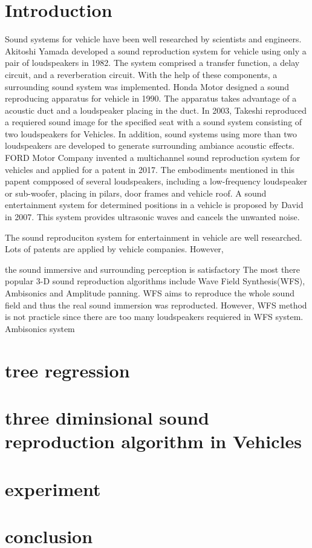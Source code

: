 \documentclass[runningheads,a4paper]{llncs}
\begin{document}
\section{Introduction}\label{sec:Intro}
Sound systems for vehicle have been well researched by scientists and engineers.   Akitoshi Yamada developed a sound reproduction system for vehicle using only a pair of loudspeakers in 1982\cite{Akito82}. The system comprised a transfer function, a delay circuit, and a reverberation circuit. With the help of these components, a surrounding sound system was implemented. 
Honda Motor designed a sound reproducing apparatus for vehicle in 1990\cite{terai1990sound}. The apparatus takes advantage of a acoustic duct and a loudspeaker placing in the duct. 
In 2003, Takeshi reproduced a requiered sound image for the specified seat with a sound system consisting of two loudspeakers for Vehicles\cite{Takeshi03}. 
In addition, sound systems using more than two loudspeakers are developed to generate surrounding ambiance acoustic effects\cite{clark1998vehicle}\cite{orellana2015loudspeaker}. 
FORD Motor Company invented a multichannel sound reproduction system for vehicles and applied for a patent in 2017\cite{orellana2015loudspeaker}. The embodiments mentioned in this papent compposed of several loudspeakers, including a low-frequency loudspeaker or sub-woofer, placing in pilars, door frames and vehicle roof. 
A sound entertainment system for determined positions in a vehicle is proposed by David in 2007. This system provides ultrasonic waves and cancels the unwanted noise\cite{David07}. 



The sound reproduciton system for entertainment in vehicle are well researched. Lots of patents are applied by vehicle companies\cite{Simon2005}\cite{Miriam2014}\cite{David07}\cite{Gibson15}. However, 

the sound immersive and surrounding perception is satisfactory
The most there popular 3-D sound reproduction algorithms include Wave Field Synthesis(WFS), Ambisonics and Amplitude panning. WFS aims to reproduce the whole sound field and thus the real sound immersion was reproducted. However, WFS method is not practicle since there are too many loudspeakers requiered in WFS system. Ambisonics system  


\section{tree regression}\label{sec:regression}

\section{three diminsional sound reproduction algorithm in Vehicles}\label{sec:algorithm}

\section{experiment}\label{sec:experiment}

\section{conclusion}\label{sec:conclusion}

\label{bib:bibliography}



\end{document}
